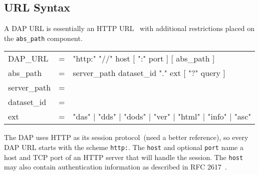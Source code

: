 \documentclass{article}
\begin{document}
\subsection{URL Syntax}
\label{sec:url-syntax}
A \ac{DAP} \ac{URL} is essentially an \ac{HTTP} \ac{URL}~\cite{rfc2616} with
additional restrictions placed on the \texttt{abs\_path} component.

\begin{ttfamily}
\begin{center}
\begin{tabular}{lll}
DAP\_URL & = & "http:" "//" host [ ":" port ] [ abs\_path ] \\
abs\_path & = & server\_path dataset\_id "." ext [ "?" query ] \\
server\_path & = & \\
dataset\_id &= & \\
ext & = & "das" | "dds" | "dods" | "ver" | "html" | "info" | "asc" \\
\end{tabular}
\end{center}
\end{ttfamily}

The \ac{DAP} uses \ac{HTTP} as its session protocol~\cite{stevens:unp}(need a
better reference), so every \ac{DAP} \ac{URL} starts with the scheme
\texttt{http:}. The \texttt{host} and optional \texttt{port} name a host and
TCP port of an \ac{HTTP} server that will handle the session. The
\texttt{host} may also contain authentication information as described in RFC
2617~\cite{rfc2617}.
\end{document}
